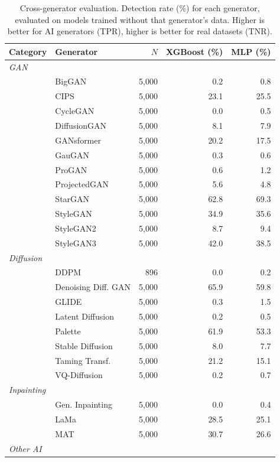 \begin{table}[t]
\centering
\small
\caption{Cross-generator evaluation. Detection rate (\%) for each generator, evaluated on models trained without that generator's data. Higher is better for AI generators (TPR), higher is better for real datasets (TNR).}
\label{tab:cross_generator}
\begin{tabular}{l l r r r}
\toprule
Category & Generator & $N$ & XGBoost (\%) & MLP (\%) \\
\midrule
\multicolumn{5}{l}{\textit{GAN}} \\
  & BigGAN & 5,000 & 0.2 & 0.8 \\
  & CIPS & 5,000 & 23.1 & 25.5 \\
  & CycleGAN & 5,000 & 0.0 & 0.5 \\
  & DiffusionGAN & 5,000 & 8.1 & 7.9 \\
  & GANsformer & 5,000 & 20.2 & 17.5 \\
  & GauGAN & 5,000 & 0.3 & 0.6 \\
  & ProGAN & 5,000 & 0.6 & 1.2 \\
  & ProjectedGAN & 5,000 & 5.6 & 4.8 \\
  & StarGAN & 5,000 & 62.8 & 69.3 \\
  & StyleGAN & 5,000 & 34.9 & 35.6 \\
  & StyleGAN2 & 5,000 & 8.7 & 9.4 \\
  & StyleGAN3 & 5,000 & 42.0 & 38.5 \\
\midrule
\multicolumn{5}{l}{\textit{Diffusion}} \\
  & DDPM & 896 & 0.0 & 0.2 \\
  & Denoising Diff. GAN & 5,000 & 65.9 & 59.8 \\
  & GLIDE & 5,000 & 0.3 & 1.5 \\
  & Latent Diffusion & 5,000 & 0.2 & 0.5 \\
  & Palette & 5,000 & 61.9 & 53.3 \\
  & Stable Diffusion & 5,000 & 8.0 & 7.7 \\
  & Taming Transf. & 5,000 & 21.2 & 15.1 \\
  & VQ-Diffusion & 5,000 & 0.2 & 0.7 \\
\midrule
\multicolumn{5}{l}{\textit{Inpainting}} \\
  & Gen. Inpainting & 5,000 & 0.0 & 0.4 \\
  & LaMa & 5,000 & 28.5 & 25.1 \\
  & MAT & 5,000 & 30.7 & 26.6 \\
\midrule
\multicolumn{5}{l}{\textit{Other AI}} \\

\end{tabular}
\end{table}
